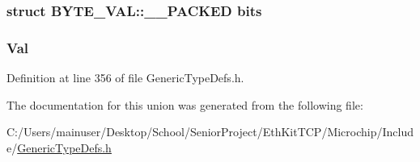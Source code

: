 \subsubsection[{bits}]{\setlength{\rightskip}{0pt plus 5cm}struct {\bf B\+Y\+T\+E\+\_\+\+V\+A\+L\+::\+\_\+\+\_\+\+P\+A\+C\+K\+E\+D}  bits}\label{union_b_y_t_e___v_a_l_ad93fac6ba505929b26fd56008e69ee6c}
\hypertarget{union_b_y_t_e___v_a_l_a5ab8c2bf45b20b5f7aa3a4f083896cec}{}
\subsubsection[{Val}]{ Val}\label{union_b_y_t_e___v_a_l_a5ab8c2bf45b20b5f7aa3a4f083896cec}


Definition at line 356 of file Generic\+Type\+Defs.\+h.



The documentation for this union was generated from the following file\+:\begin{DoxyCompactItemize}
\item 
C\+:/\+Users/mainuser/\+Desktop/\+School/\+Senior\+Project/\+Eth\+Kit\+T\+C\+P/\+Microchip/\+Include/\hyperlink{_generic_type_defs_8h}{Generic\+Type\+Defs.\+h}\end{DoxyCompactItemize}
